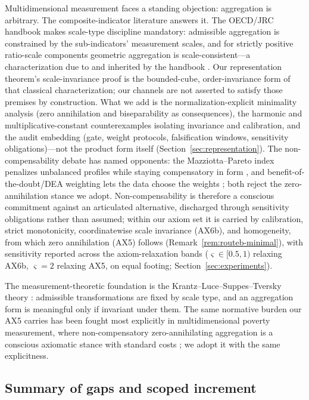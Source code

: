 Multidimensional measurement faces a standing objection: aggregation is
arbitrary. The composite-indicator literature answers it. The OECD/JRC
handbook makes scale-type discipline mandatory: admissible aggregation is
constrained by the sub-indicators' measurement scales, and for strictly
positive ratio-scale components geometric aggregation is scale-consistent---a
characterization due to \citet{ebert_welsch2004} and inherited by the handbook
\citep{oecd2008}. Our representation theorem's scale-invariance proof is the
bounded-cube, order-invariance form of that classical characterization; our
channels are not asserted to satisfy those premises by construction. What we
add is the normalization-explicit minimality analysis (zero annihilation and
biseparability as consequences), the harmonic and multiplicative-constant
counterexamples isolating invariance and calibration, and the audit embedding
(gate, weight protocols, falsification windows, sensitivity obligations)---not
the product form itself (Section~\ref{sec:representation}). The
non-compensability debate has named opponents: the Mazziotta--Pareto index
penalizes unbalanced profiles while staying compensatory in form
\citep{mazziotta2016}, and benefit-of-the-doubt/DEA weighting lets the data
choose the weights \citep{cherchye2007}; both reject the zero-annihilation
stance we adopt. Non-compensability is therefore a conscious commitment
against an articulated alternative, discharged through sensitivity
obligations rather than assumed; within our axiom set it is carried by
calibration, strict monotonicity, coordinatewise scale invariance (AX6b), and
homogeneity, from which zero annihilation (AX5) follows
(Remark~\ref{rem:routeb-minimal}), with sensitivity reported across the
axiom-relaxation bands ($\varsigma\in[0.5,1)$ relaxing AX6b, $\varsigma=2$
relaxing AX5, on equal footing; Section~\ref{sec:experiments}).

The measurement-theoretic foundation is the Krantz--Luce--Suppes--Tversky
theory \citep{krantz1971}: admissible transformations are fixed by scale type,
and an aggregation form is meaningful only if invariant under them. The same
normative burden our AX5 carries has been fought most explicitly in
multidimensional poverty measurement, where non-compensatory zero-annihilating
aggregation is a conscious axiomatic stance with standard costs
\citep{alkire2011}; we adopt it with the same explicitness.

\subsection{Summary of gaps and scoped increment}\label{rw:gaps}

